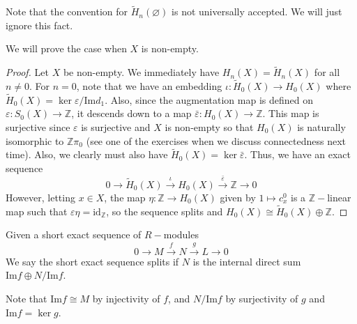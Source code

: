 \documentclass[12pt,reqno]{amsart}
\numberwithin{theorem}{section}
\theoremstyle{definition}
\theoremstyle{remark}
\numberwithin{equation}{section}
\newcommand{\Z}{\mathbb Z}
\renewcommand{\Im}{\text{Im}}
\theoremstyle{definition}
\newcommand{\id}{\mathrm{id}}
\begin{document}
\begin{remark}
    Note that the convention for $\tilde H_n(\varnothing)$ is not universally accepted. We will just ignore this fact.
\end{remark}
We will prove the case when $X$ is non-empty.
\begin{proof}
    Let $X$ be non-empty. We immediately have $H_n(X) = \tilde H_n(X)$ for all $n \neq 0$. For $n = 0$, note that we have an embedding $\iota: \tilde H_0(X) \rightarrow H_0(X)$ where $\tilde H_0(X) = \ker \varepsilon /\Im d_1$. Also, since the augmentation map is defined on $\varepsilon :S_0(X) \rightarrow \Z$, it descends down to a map $\bar \varepsilon: H_0(X) \rightarrow \Z$. This map is surjective since $\varepsilon$ is surjective and $X$ is non-empty so that $H_0(X)$ is naturally isomorphic to $\Z \pi_0 $ (see one of the exercises when we discuss connectedness next time). Also, we clearly must also have $\tilde H_0(X) = \ker \bar \varepsilon$. Thus, we have an exact sequence
    $$0 \rightarrow \tilde H_0(X) \xrightarrow{\iota} H_0(X) \xrightarrow{\bar \varepsilon } \Z \rightarrow 0$$
    However, letting $x \in X$, the map $\eta:\Z \rightarrow  H_0(X)$ given by $1 \mapsto c^0_x$ is a $\Z-$linear map such that $\varepsilon\eta = \id_\Z$, so the sequence splits and $H_0(X) \cong \tilde H_0(X) \oplus \Z$.
\end{proof}
\begin{definition}
    Given a short exact sequence of $R-$modules
    $$0 \rightarrow M \xrightarrow{f} N \xrightarrow{g} L \rightarrow 0 $$
    We say the short exact sequence splits if $N$ is the internal direct sum $\Im f \oplus N/\Im f$. 
\end{definition}
\begin{remark}
    Note that $\Im f \cong M$ by injectivity of $f$, and $N/\Im f$ by surjectivity of $g$ and $\Im f = \ker g$. 
\end{remark}
\end{document}
